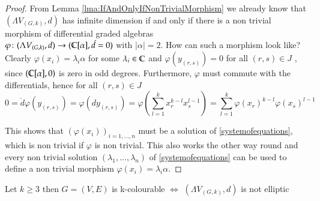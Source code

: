 \begin{proof}
 From Lemma \ref{lma:IfAndOnlyIfNonTrivialMorphism} we already know that $(\Lambda V_{(G,k)},d)$  has infinite dimension if and only if 
 there is a non trivial morphism of differential graded algebras \\
 ${\varphi \colon (\Lambda V_{(G,k)},d) \to ( \mathbb{C} [\alpha] ,\acute{d} = 0)}$ with $|\alpha| = 2$. How can such a morphism look like?
 Clearly $\varphi(x_i) = \lambda_i \alpha$ for some $\lambda_i \in \mathbb{C}$ and $\varphi(y_{(r,s)}) = 0$ for all $(r,s) \in J$ , since 
 $(\mathbb{C} [\alpha] , 0)$ is zero in odd degrees. Furthermore, $\varphi$ must commute with the differentials, hence 
 for all $(r,s) \in J$
 $$ 0 = \acute{d} \varphi(y_{(r,s)}) = \varphi(dy_{(r,s)}) = \varphi(\sum_{l = 1}^k x_r^{k -l} x_s^{l - 1})
 = \sum_{l = 1}^k \varphi(x_r)^{k -l} \varphi(x_s)^{l - 1}$$
 
 This shows that $(\varphi(x_i))_{i = 1, \dotsc , n}$ must be a solution of \ref{systemofequations}, which is non trivial
 if $\varphi$ is non trivial.
 This also works the other way round and every non trivial solution  $(\lambda_1 , \dotsc, \lambda_n)$ of \ref{systemofequations}
 can be used to define a non trivial morphism $\varphi(x_i) = \lambda_i \alpha$.
 \end{proof}

 \begin{Theorem}
 \label{thm:KColourEquivalentToNonEllipticity}
  Let $k \geq 3$ then 
   $G = (V,E)$ is k-colourable $\iff$ $(\Lambda V_{(G,k)},d)$ is not elliptic
 \end{Theorem}

